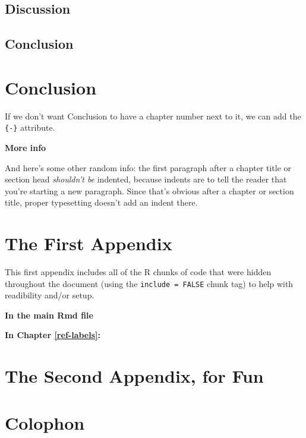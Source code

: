 \documentclass[twoside,12pt,final]{ucthesis-CA2012}
\begin{document}
\begin{ucmainmatter}
{\section{Discussion}\label{discussion-2}}

\hypertarget{conclusion-2}{%
\section{Conclusion}\label{conclusion-2}}

\hypertarget{conclusion-3}{%
\chapter*{Conclusion}\label{conclusion-3}}

If we don't want Conclusion to have a chapter number next to it, we can add the \texttt{\{-\}} attribute.

\textbf{More info}

And here's some other random info: the first paragraph after a chapter title or section head \emph{shouldn't be} indented, because indents are to tell the reader that you're starting a new paragraph. Since that's obvious after a chapter or section title, proper typesetting doesn't add an indent there.

\appendix

\hypertarget{the-first-appendix}{%
\chapter{The First Appendix}\label{the-first-appendix}}

This first appendix includes all of the R chunks of code that were hidden throughout the document (using the \texttt{include\ =\ FALSE} chunk tag) to help with readibility and/or setup.

\textbf{In the main Rmd file}

\textbf{In Chapter \ref{ref-labels}:}

\hypertarget{the-second-appendix-for-fun}{%
\chapter{The Second Appendix, for Fun}\label{the-second-appendix-for-fun}}

\hypertarget{colophon}{%
\chapter*{Colophon}\label{colophon}}


\end{ucmainmatter}
\end{document}
